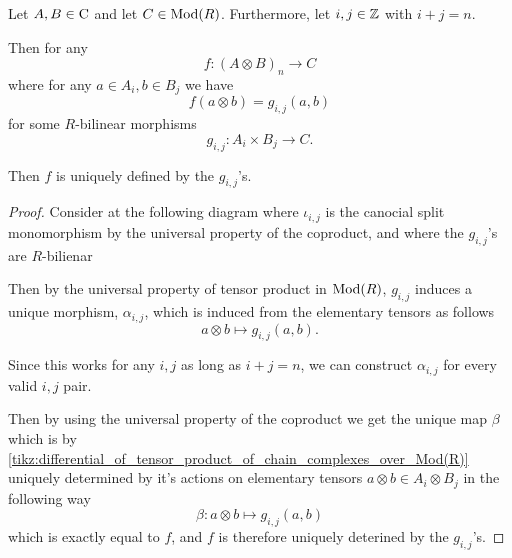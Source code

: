 \begin{lemma}
    \label{lem:map_out_of_tensor_unique}
    Let \( A, B \in \operatorname{C} \) and let \( C \in \operatorname{Mod}(R) \). Furthermore, let \( i, j \in {\mathbb{Z}} \) with \( i + j = n \).

    Then for any
    \[
        f: (A \otimes B)_n \to C
    \]
    where for any \( a \in A_i, b \in B_j \) we have
    \[
        f(a \otimes b) = g_{i, j}(a, b)
    \]
    for some \( R \)-bilinear morphisms
    \[
        g_{i, j}: A_i \times B_j \to C.
    \]

    Then \( f \) is uniquely defined by the \( g_{i, j} \)'s.
\end{lemma}
\begin{proof}
    Consider at the following diagram where \( \iota_{i, j} \) is the canocial split monomorphism by the universal property of the coproduct, and where the \( g_{i, j} \)'s are \( R \)-bilienar
    \begin{diagramlabel}[\label{tikz:differential_of_tensor_product_of_chain_complexes_over_Mod(R)}]
    \end{diagramlabel}

    Then by the universal property of tensor product in \( \operatorname{Mod}(R) \), \( g_{i, j} \) induces a unique morphism, \( \alpha_{i, j} \), which is induced from the elementary tensors as follows
    \[
        a \otimes b \mapsto g_{i, j}(a, b).
    \]

    Since this works for any \( i, j \) as long as \( i + j = n \), we can construct \( \alpha_{i, j} \) for every valid \( i, j \) pair.

    Then by using the universal property of the coproduct we get the unique map \( \beta \) which is by \autoref{tikz:differential_of_tensor_product_of_chain_complexes_over_Mod(R)} uniquely determined by it's actions on elementary tensors \( a \otimes b \in A_i \otimes B_j \) in the following way
    \[
        \beta: a \otimes b \mapsto g_{i, j}(a, b)
    \]
    which is exactly equal to \( f \), and \( f \) is therefore uniquely deterined by the \( g_{i, j} \)'s.
\end{proof}

